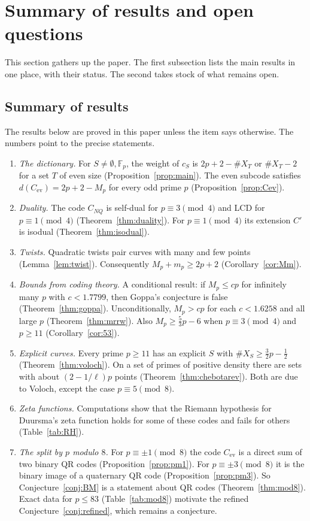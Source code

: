 \documentclass[12pt,letterpaper]{article}
\theoremstyle{definition}
\theoremstyle{remark}
\numberwithin{equation}{section}
\newcommand{\Fp}{\mathbb{F}_p}
\newcommand{\CNQ}{C_{NQ}}
\newcommand{\Cev}{C_{\mathrm{ev}}}
\newcommand{\X}{\#X}
\begin{document}
\section{Summary of results and open questions}
\label{sec:open}

This section gathers up the paper. The first subsection lists the main results in
one place, with their status. The second takes stock of what remains open.

\subsection{Summary of results}

The results below are proved in this paper unless the item says otherwise. The
numbers point to the precise statements.

\begin{enumerate}
\item \emph{The dictionary.} For $S\ne\emptyset,\Fp$, the weight of $c_S$ is
$2p+2-\X_T$ or $\X_T-2$ for a set $T$ of even size (Proposition~\ref{prop:main}). The even subcode
satisfies $d(\Cev)=2p+2-M_p$ for every odd prime $p$ (Proposition~\ref{prop:Cev}).
\item \emph{Duality.} The code $\CNQ$ is self-dual for $p\equiv3\pmod4$ and LCD for
$p\equiv1\pmod4$ (Theorem~\ref{thm:duality}). For $p\equiv1\pmod4$ its extension
$C'$ is isodual (Theorem~\ref{thm:isodual}).
\item \emph{Twists.} Quadratic twists pair curves with many and few points
(Lemma~\ref{lem:twist}). Consequently $M_p+m_p\ge2p+2$ (Corollary~\ref{cor:Mm}).
\item \emph{Bounds from coding theory.} A conditional result: if $M_p\le cp$ for
infinitely many $p$ with $c<1.7799$, then Goppa's conjecture is false
(Theorem~\ref{thm:goppa}). Unconditionally, $M_p>cp$ for each $c<1.6258$ and all
large $p$ (Theorem~\ref{thm:mrrw}). Also $M_p\ge\frac53p-6$ when $p\equiv3\pmod4$
and $p\ge11$ (Corollary~\ref{cor:53}).
\item \emph{Explicit curves.} Every prime $p\ge11$ has an explicit $S$ with
$\X_S\ge\frac32p-\frac12$ (Theorem~\ref{thm:voloch}). On a set of primes of positive
density there are sets with about $(2-1/\ell)p$ points (Theorem~\ref{thm:chebotarev}).
Both are due to Voloch, except the case $p\equiv5\pmod8$.
\item \emph{Zeta functions.} Computations show that the Riemann hypothesis for
Duursma's zeta function holds for some of these codes and fails for others
(Table~\ref{tab:RH}).
\item \emph{The split by $p$ modulo $8$.} For $p\equiv\pm1\pmod8$ the code $\Cev$ is a
direct sum of two binary QR codes (Proposition~\ref{prop:pm1}). For
$p\equiv\pm3\pmod8$ it is the binary image of a quaternary QR code
(Proposition~\ref{prop:pm3}). So Conjecture~\ref{conj:BM} is a statement about QR codes
(Theorem~\ref{thm:mod8}). Exact data for $p\le83$ (Table~\ref{tab:mod8}) motivate
the refined Conjecture~\ref{conj:refined}, which remains a conjecture.
\end{enumerate}
\end{document}
